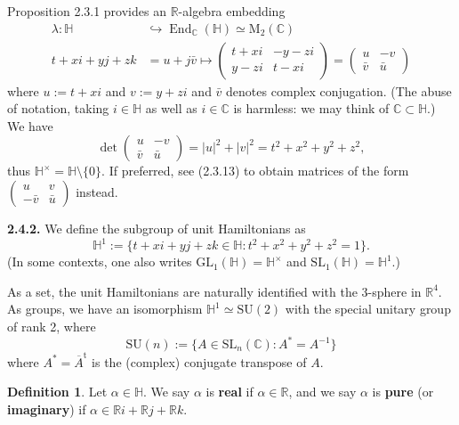 \documentclass{article}
\theoremstyle{definition}
\newtheorem{definition}[theorem]{Definition}
\begin{document}
Proposition 2.3.1 provides an $\mathbb{R}$-algebra embedding
\begin{equation}
\begin{aligned}
\lambda : \mathbb{H} &\hookrightarrow \operatorname{End}_{\mathbb{C}}(\mathbb{H}) \simeq \mathrm{M}_2(\mathbb{C}) \\
t + xi + yj + zk &= u + j\bar{v} \mapsto \begin{pmatrix} t + xi & -y - zi \\ y - zi & t - xi \end{pmatrix} = \begin{pmatrix} u & -v \\ \bar{v} & \bar{u} \end{pmatrix}
\end{aligned} \tag{2.4.1}
\end{equation}
where $u := t + xi$ and $v := y + zi$ and $\bar{v}$ denotes complex conjugation. (The abuse of notation, taking $i \in \mathbb{H}$ as well as $i \in \mathbb{C}$ is harmless: we may think of $\mathbb{C} \subset \mathbb{H}$.) We have
$$\det \begin{pmatrix} u & -v \\ \bar{v} & \bar{u} \end{pmatrix} = |u|^2 + |v|^2 = t^2 + x^2 + y^2 + z^2,$$
thus $\mathbb{H}^\times = \mathbb{H} \setminus \{0\}$. If preferred, see (2.3.13) to obtain matrices of the form $\begin{pmatrix} u & v \\ -\bar{v} & \bar{u} \end{pmatrix}$ instead.

\textbf{2.4.2.} We define the subgroup of unit Hamiltonians as
$$\mathbb{H}^1 := \{t + xi + yj + zk \in \mathbb{H} : t^2 + x^2 + y^2 + z^2 = 1\}.$$
(In some contexts, one also writes $\mathrm{GL}_1(\mathbb{H}) = \mathbb{H}^\times$ and $\mathrm{SL}_1(\mathbb{H}) = \mathbb{H}^1$.)

As a set, the unit Hamiltonians are naturally identified with the 3-sphere in $\mathbb{R}^4$. As groups, we have an isomorphism $\mathbb{H}^1 \simeq \mathrm{SU}(2)$ with the special unitary group of rank 2, where
\begin{equation}
\mathrm{SU}(n) := \{A \in \mathrm{SL}_n(\mathbb{C}) : A^* = A^{-1}\} \tag{2.4.3}
\end{equation}
where $A^* = \overline{A}^{\mathrm{t}}$ is the (complex) conjugate transpose of $A$.

\begin{definition}
Let $\alpha \in \mathbb{H}$. We say $\alpha$ is \textbf{real} if $\alpha \in \mathbb{R}$, and we say $\alpha$ is \textbf{pure} (or \textbf{imaginary}) if $\alpha \in \mathbb{R}i + \mathbb{R}j + \mathbb{R}k$.
\end{definition}
\end{document}
